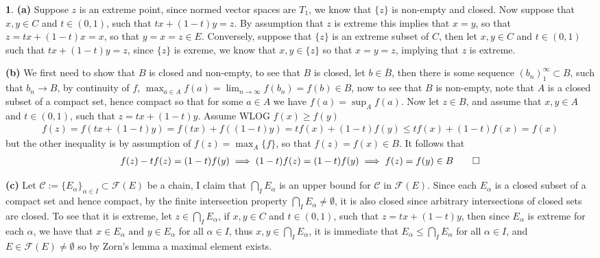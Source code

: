 \documentclass[10.5pt]{article}
\theoremstyle{definition}
\newtheorem{pb}{}
\newcommand{\set}[1]{\{#1\}}
\newcommand{\tand}{\text{ and }}
\begin{document}
    \begin{pb}
        \textbf{(a)} Suppose \(z\) is an extreme point, since normed vector spaces are \(T_1\), we know that \(\set{z}\) is non-empty and closed. Now suppose that \(x,y \in C\) and \(t \in (0,1)\), such that \(tx + (1-t)y = z\). By assumption that \(z\) is extreme this implies that \(x = y\), so that \(z = tx + (1-t)x = x\), so that \(y = x = z \in E\). Conversely, suppose that \(\set{z}\) is an extreme subset of \(C\), then let \(x,y \in C\) and \(t \in (0,1)\) such that \(tx + (1-t)y = z\), since \(\set{z}\) is exreme, we know that \(x,y\in \set{z}\) so that \(x = y = z\), implying that \(z\) is extreme.

        \textbf{(b)} We first need to show that \(B\) is closed and non-empty, to see that \(B\) is closed, let \(b \in \overline{B}\), then there is some sequence \((b_n)_1^\infty \subset B\), such that \(b_n \to B\), by continuity of \(f\), \(\max_{a \in A}f(a) = \lim_{n\to\infty}f(b_n) = f(b) \in B\), now to see that \(B\) is non-empty, note that \(A\) is a closed subset of a compact set, hence compact so that for some \(a \in A\) we have \(f(a) = \sup_Af(a)\). Now let \(z \in B\), and assume that \(x,y \in A\) and \(t \in (0,1)\), such that \(z = tx + (1-t)y\). Assume WLOG \(f(x) \geq f(y)\)
        \begin{align*}
            f(z) = f(tx + (1-t)y) = f(tx) + f((1-t)y) = tf(x) + (1-t)f(y) \leq tf(x) + (1-t)f(x) = f(x)
        \end{align*}
        but the other inequality is by assumption of \(f(z) = \max_A\set{f}\), so that \(f(z) = f(x) \in B\). It follows that
        \begin{align*}
            f(z) - tf(z) = (1-t)f(y) \implies (1-t)f(z) = (1-t)f(y) \implies f(z) = f(y) \in B \qed
        \end{align*}

        \textbf{(c)} Let \(\mathcal{C} := \set{E_\alpha}_{\alpha \in I} \subset \mathcal{F}(E)\) be a chain, I claim that \(\bigcap_I E_\alpha\) is an upper bound for \(\mathcal{C}\) in \(\mathcal{F}(E)\). Since each \(E_\alpha\) is a closed subset of a compact set and hence compact, by the finite intersection property \(\bigcap_I E_\alpha \neq \emptyset\), it is also closed since arbitrary intersections of closed sets are closed. To see that it is extreme, let \(z \in \bigcap_I E_\alpha\), if \(x,y \in C\) and \(t \in (0,1)\), such that \(z = tx + (1-t)y\), then since \(E_\alpha\) is extreme for each \(\alpha\), we have that \(x \in E_\alpha \tand y \in E_\alpha\) for all \(\alpha \in I\), thus \(x,y \in \bigcap_I E_\alpha\), it is immediate that \(E_\alpha \leq \bigcap_I E_\alpha\) for all \(\alpha \in I\), and \(E \in \mathcal{F}(E) \neq \emptyset\) so by Zorn's lemma a maximal element exists.


\end{pb}
\end{document}
